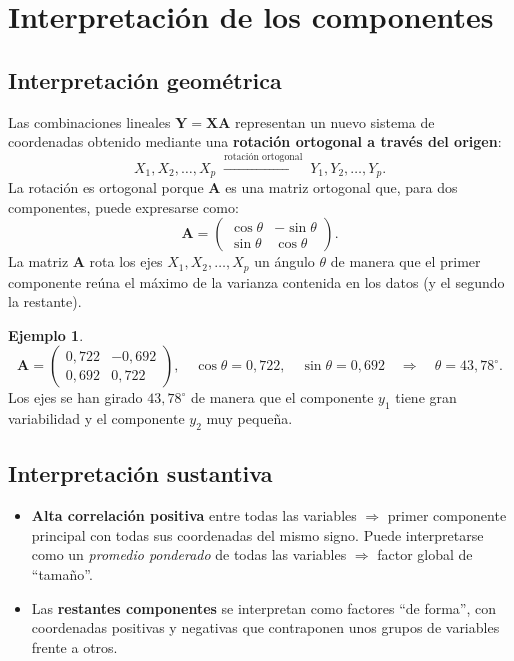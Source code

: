 \documentclass[12pt, a4paper]{article}
\theoremstyle{plain}
\theoremstyle{definition}
\newtheorem{ejemplo}{Ejemplo}[section]
\theoremstyle{remark}
\newcommand{\mat}[1]{\mathbf{#1}}
\begin{document}
\section{Interpretación de los componentes}

\subsection{Interpretación geométrica}

Las combinaciones lineales $\mat{Y}=\mathbf{X}\mat{A}$ representan un nuevo
sistema de coordenadas obtenido mediante una \textbf{rotación ortogonal a
través del origen}:
\[
  X_1, X_2, \dots, X_p
  \;\xrightarrow{\text{rotación ortogonal}}\;
  Y_1, Y_2, \dots, Y_p.
\]
La rotación es ortogonal porque $\mat{A}$ es una matriz ortogonal que, para
dos componentes, puede expresarse como:
\[
  \mat{A} = \begin{pmatrix}\cos\theta & -\sin\theta\\
             \sin\theta & \cos\theta\end{pmatrix}.
\]
La matriz $\mat{A}$ rota los ejes $X_1, X_2, \dots, X_p$ un ángulo $\theta$
de manera que el primer componente reúna el máximo de la varianza contenida
en los datos (y el segundo la restante).

\begin{ejemplo}
\[
  \mat{A}=\begin{pmatrix}0{,}722&-0{,}692\\0{,}692&0{,}722\end{pmatrix},
  \quad\cos\theta=0{,}722,\quad\sin\theta=0{,}692
  \quad\Rightarrow\quad\theta=43{,}78^\circ.
\]
Los ejes se han girado $43{,}78^\circ$ de manera que el componente $y_1$ tiene
gran variabilidad y el componente $y_2$ muy pequeña.
\end{ejemplo}

\subsection{Interpretación sustantiva}

\begin{itemize}
  \item \textbf{Alta correlación positiva} entre todas las variables
        $\Rightarrow$ primer componente principal con todas sus coordenadas
        del mismo signo. Puede interpretarse como un \emph{promedio ponderado}
        de todas las variables $\Rightarrow$ factor global de ``tamaño''.
  \item Las \textbf{restantes componentes} se interpretan como factores ``de
        forma'', con coordenadas positivas y negativas que contraponen unos
        grupos de variables frente a otros.
\end{itemize}
\end{document}
